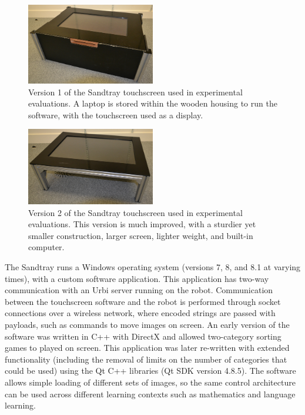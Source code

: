 \begin{figure}[ht]
    \centering
    \includegraphics[width=0.5\textwidth]{images/ch3_old_sandtray.jpg}
    \caption{Version 1 of the Sandtray touchscreen used in experimental evaluations. A laptop is stored within the wooden housing to run the software, with the touchscreen used as a display.}
    \label{fig:ch3_old_sandtray}
\end{figure}

\begin{figure}[ht]
    \centering
    \includegraphics[width=0.5\textwidth]{images/ch3_new_sandtray.jpg}
    \caption{Version 2 of the Sandtray touchscreen used in experimental evaluations. This version is much improved, with a sturdier yet smaller construction, larger screen, lighter weight, and built-in computer.}
    \label{fig:ch3_new_sandtray}
\end{figure}

The Sandtray runs a Windows operating system (versions 7, 8, and 8.1 at varying times), with a custom software application. This application has two-way communication with an Urbi server running on the robot. Communication between the touchscreen software and the robot is performed through socket connections over a wireless network, where encoded strings are passed with payloads, such as commands to move images on screen. An early version of the software was written in C++ with DirectX and allowed two-category sorting games to played on screen. This application was later re-written with extended functionality (including the removal of limits on the number of categories that could be used) using the Qt C++ libraries (Qt SDK version 4.8.5). The software allows simple loading of different sets of images, so the same control architecture can be used across different learning contexts such as mathematics and language learning.

